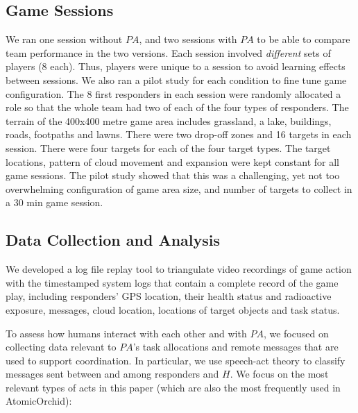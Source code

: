 \subsection{Game Sessions}
\noindent We ran one session without $PA$, and two sessions with $PA$ to be able to compare team performance in the two versions. Each session involved \emph{different} sets of players (8 each). Thus,  players were unique to a session to avoid learning effects between sessions. We also ran a pilot study for each condition to fine tune game configuration. The 8 first responders in each session were randomly allocated a role so that the whole team had two of each of the four types of responders. The terrain of the 400x400 metre  game area includes grassland, a lake, buildings, roads,  footpaths and lawns. There were two  drop-off zones and 16 targets in each session. There were four targets for each of the four target types. The target locations, pattern of cloud movement and expansion were kept constant for all game sessions. The pilot study showed that this was a challenging, yet not too overwhelming configuration of game area size, and number of targets to collect in a 30 min game session. 

\subsection{Data Collection and Analysis}
\noindent We developed a log file replay tool to triangulate video recordings of game action with the timestamped system logs that contain a complete record of the game play, including responders' GPS location, their health status and radioactive exposure, messages, cloud location, locations of target objects and task status.


To assess how humans interact with each other and with $PA$, we focused on collecting data relevant to $PA$'s task allocations and remote messages  that are used to support coordination. In particular, we use speech-act theory \cite{searle:1975} to classify messages sent between and among responders and $H$. We focus on the most relevant types of acts in this paper (which are also the most frequently used in AtomicOrchid):

